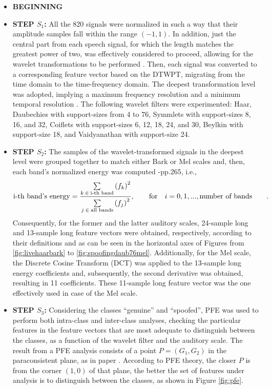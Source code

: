 		\begin{itemize}
			\item{}\textbf{BEGINNING}
			\item{}\textbf{STEP $S_1$: }All the 820 signals were normalized in such a way that their amplitude samples fall within the range $(-1,1)$. In addition, just the central part from each speech signal, for which the length matches the greatest power of two, was effectively considered to proceed, allowing for the wavelet transformations to be performed \cite{guidodwt1}. Then, each signal was converted to a corresponding feature vector based on the DTWPT, migrating from the time domain to the time-frequency domain. The deepest transformation level was adopted, implying a maximum frequency resolution and a minimum temporal resolution \cite{guidodwt1}. The following wavelet filters were experimented: Haar, Daubechies with support-sizes from 4 to 76, Symmlets with support-sizes 8, 16, and 32, Coiflets with support-sizes 6, 12, 18, 24, and 30, Beylkin with support-size 18, and Vaidyanathan with support-size 24. 
			\item{}\textbf{STEP $S_2$: }The samples of the wavelet-transformed signals in the deepest level were grouped together to match either Bark \cite{bossi} or Mel scales \cite{bossi2} and, then, each band's normalized energy was computed \cite{tut_se}-pp.265, i.e., $$\text{i-th band's energy}=\frac{\sum\limits_{k \hspace*{+2pt} \in \hspace*{+2pt} \text{i-th band}}{{(f_k)}^{2}}}{\sum\limits_{j \hspace*{+2pt} \in \hspace*{+2pt} \text{all bands}}^{}{(f_j)}^{2}}, \qquad \text{for} \quad i=0, 1, ..., \text{number of bands}\qquad .$$ Consequently, for the former and the latter auditory scales, 24-sample long and 13-sample long feature vectors were obtained, respectively, according to their definitions \cite{bossi2} and as can be seen in the horizontal axes of Figures from \ref{fig:livehaarbark} to \ref{fig:spoofingdaub76mel}. Additionally, for the Mel scale, the Discrete Cosine Transform (DCT) was applied to the 13-sample long energy coefficients and, subsequently, the second derivative was obtained, resulting in 11 coefficients. These 11-sample long feature vector was the one effectively used in case of the Mel scale. 
			\item{}\textbf{STEP $S_3$: }Considering the classes ``genuine'' and ``spoofed'', PFE was used to perform both intra-class and inter-class analyses, checking the particular features in the feature vectors that are most adequate to distinguish between the classes, as a function of the wavelet filter and the auditory scale. The result from a PFE analysis consists of a point $P=(G_1,G_2)$ in the paraconsistent plane, as in paper \cite{8588433}. According to PFE theory, the closer $P$ is from the corner $(1,0)$ of that plane, the better the set of features under analysis is to distinguish between the classes, as shown in Figure \ref{fig:pfe}. 

\end{itemize}
